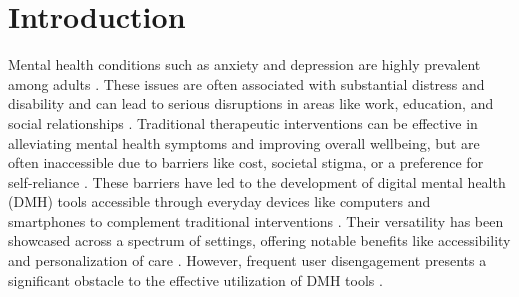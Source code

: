 \section{Introduction}

Mental health conditions such as anxiety and depression are highly prevalent among adults \cite{vahratian2021symptoms, thomeer2023racial}. These issues are often associated with substantial distress and disability and can lead to serious disruptions in areas like work, education, and social relationships \cite{goodwin2022trends, kessler2022estimated}. Traditional therapeutic interventions can be effective in alleviating mental health symptoms and improving overall wellbeing, but are often inaccessible due to barriers like cost, societal stigma, or a preference for self-reliance \cite{gulliver2010perceived, robards2018marginalized, oguamanam2023intersectional, lattie2020designing, frik2023model}. 
These barriers have led to the development of digital mental health (DMH) tools accessible through everyday devices like computers and smartphones to complement traditional interventions \cite{fairburn2017impact, mohr2017personal, bhattacharjee2023investigating}. Their versatility has been showcased across a spectrum of settings, offering notable benefits like accessibility and personalization of care \cite{lattie2022overview, kornfield2022meeting, pendse2022treatment, mohr2018solution}.
However, frequent user disengagement presents a significant obstacle to the effective utilization of DMH tools \cite{borghouts2021barriers}. 

